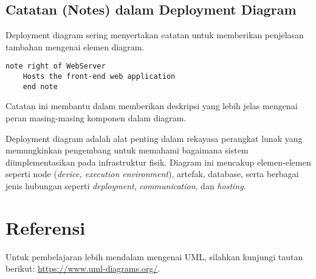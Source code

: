 \subsection{Catatan (Notes) dalam Deployment Diagram}
Deployment diagram sering menyertakan catatan untuk memberikan penjelasan tambahan mengenai elemen diagram.

\begin{lstlisting}[language=puml,caption={Contoh Catatan dalam Deployment Diagram}]
	note right of WebServer
	Hosts the front-end web application
	end note
\end{lstlisting}

Catatan ini membantu dalam memberikan deskripsi yang lebih jelas mengenai peran masing-masing komponen dalam diagram.

Deployment diagram adalah alat penting dalam rekayasa perangkat lunak yang memungkinkan pengembang untuk memahami bagaimana sistem diimplementasikan pada infrastruktur fisik. Diagram ini mencakup elemen-elemen seperti node (\textit{device, execution environment}), artefak, database, serta berbagai jenis hubungan seperti \textit{deployment}, \textit{communication}, dan \textit{hosting}. 

\section{Referensi}
Untuk pembelajaran lebih mendalam mengenai UML, silahkan kunjungi tautan berikut: \url{https://www.uml-diagrams.org/}.


